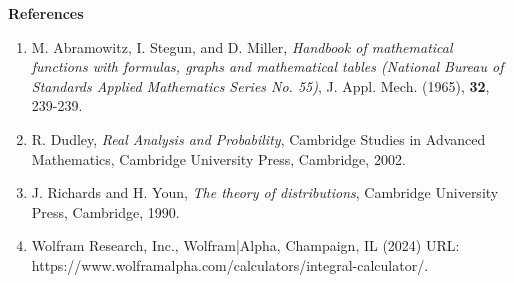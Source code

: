 \documentclass[10pt]{article}
\newcommand{\1}[1]{\mathbbm{1}_{#1}}
\begin{document}
    \begin{center}
        {\bf\large References}
    \end{center}
    \begin{enumerate}
        \item M. Abramowitz, I. Stegun, and D. Miller, {\it Handbook of mathematical functions with formulas, graphs and mathematical tables (National Bureau of Standards Applied Mathematics Series No. 55)}, J. Appl. Mech. (1965), \textbf{32}, 239-239.
        \item R. Dudley, {\it Real Analysis and Probability}, Cambridge Studies in Advanced Mathematics, Cambridge University Press, Cambridge, 2002.
        \item J. Richards and H. Youn, {\it The theory of distributions}, Cambridge University Press, Cambridge, 1990.
        \item Wolfram Research, Inc., Wolfram|Alpha, Champaign, IL (2024) URL: https://www.wolframalpha.com/calculators/integral-calculator/.
    \end{enumerate}
\end{document}
